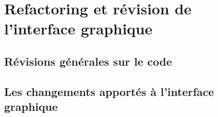 \section{Refactoring et révision de l'interface graphique}

\subsection{Révisions générales sur le code}

\subsection{Les changements apportés à l'interface graphique}
